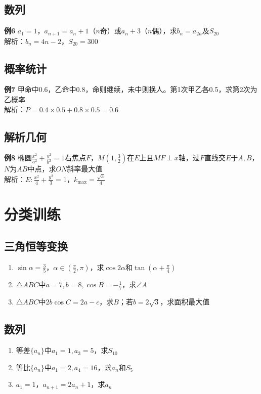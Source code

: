 \documentclass[12pt,a4paper]{ctexbook}
\begin{document}
\section{数列}
\textbf{例6} $a_1=1$，$a_{n+1}=a_n+1$（$n$奇）或$a_n+3$（$n$偶），求$b_n=a_{2n}$及$S_{20}$\\
解析：$b_n=4n-2$，$S_{20}=300$

\section{概率统计}
\textbf{例7} 甲命中0.6，乙命中0.8，命则继续，未中则换人。第1次甲乙各0.5，求第2次为乙概率\\
解析：$P=0.4\times0.5+0.8\times0.5=0.6$

\section{解析几何}
\textbf{例8} 椭圆$\frac{x^2}{a^2}+\frac{y^2}{b^2}=1$右焦点$F$，$M(1,\frac32)$在$E$上且$MF\perp x$轴，过$F$直线交$E$于$A,B$，$N$为$AB$中点，求$ON$斜率最大值\\
解析：$E:\frac{x^2}{4}+\frac{y^2}{3}=1$，$k_{\max}=\frac{\sqrt3}{4}$

\chapter{分类训练}

\section{三角恒等变换}
\begin{enumerate}
  \item[★] $\sin\alpha=\frac35$，$\alpha\in(\frac{\pi}{2},\pi)$，求$\cos2\alpha$和$\tan(\alpha+\frac{\pi}{4})$
  \item[★] $\triangle ABC$中$a=7,b=8,\cos B=-\frac17$，求$\angle A$
  \item[★★] $\triangle ABC$中$2b\cos C=2a-c$，求$B$；若$b=2\sqrt3$，求面积最大值
\end{enumerate}

\section{数列}
\begin{enumerate}
  \item[★] 等差$\{a_n\}$中$a_1=1,a_3=5$，求$S_{10}$
  \item[★] 等比$\{a_n\}$中$a_1=2,a_4=16$，求$a_n$和$S_5$
  \item[★★] $a_1=1$，$a_{n+1}=2a_n+1$，求$a_n$
\end{enumerate}
\end{document}
